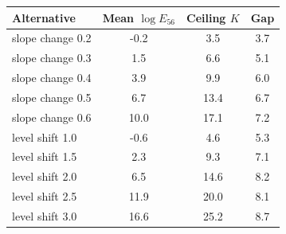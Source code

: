 \begin{tabular}{lccc}
\toprule
Alternative & Mean $\log E_{56}$ & Ceiling $K$ & Gap \\
\midrule
slope change 0.2 & -0.2 & 3.5 & 3.7 \\
slope change 0.3 & 1.5 & 6.6 & 5.1 \\
slope change 0.4 & 3.9 & 9.9 & 6.0 \\
slope change 0.5 & 6.7 & 13.4 & 6.7 \\
slope change 0.6 & 10.0 & 17.1 & 7.2 \\
level shift 1.0 & -0.6 & 4.6 & 5.3 \\
level shift 1.5 & 2.3 & 9.3 & 7.1 \\
level shift 2.0 & 6.5 & 14.6 & 8.2 \\
level shift 2.5 & 11.9 & 20.0 & 8.1 \\
level shift 3.0 & 16.6 & 25.2 & 8.7 \\
\bottomrule
\end{tabular}
